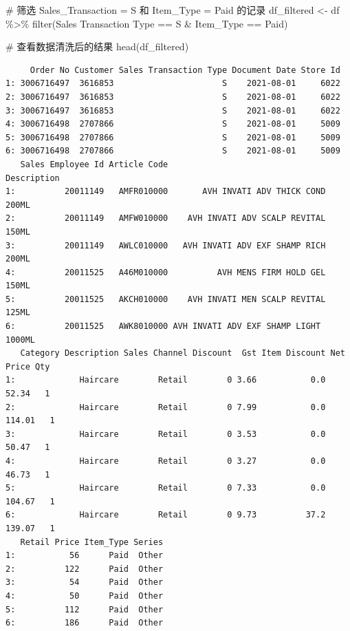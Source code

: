 \documentclass[
  letterpaper,
  DIV=11,
  numbers=noendperiod]{scrartcl}
\newenvironment{Shaded}{\begin{snugshade}}{\end{snugshade}}
\newcommand{\AttributeTok}[1]{\textcolor[rgb]{0.40,0.45,0.13}{#1}}
\newcommand{\CommentTok}[1]{\textcolor[rgb]{0.37,0.37,0.37}{#1}}
\newcommand{\FunctionTok}[1]{\textcolor[rgb]{0.28,0.35,0.67}{#1}}
\newcommand{\NormalTok}[1]{\textcolor[rgb]{0.00,0.23,0.31}{#1}}
\newcommand{\OtherTok}[1]{\textcolor[rgb]{0.00,0.23,0.31}{#1}}
\newcommand{\SpecialCharTok}[1]{\textcolor[rgb]{0.37,0.37,0.37}{#1}}
\newcommand{\StringTok}[1]{\textcolor[rgb]{0.13,0.47,0.30}{#1}}
\begin{document}
\begin{Shaded}
\begin{Highlighting}[]
\CommentTok{\# 筛选 Sales\_Transaction = \textquotesingle{}S\textquotesingle{} 和 Item\_Type = \textquotesingle{}Paid\textquotesingle{} 的记录}
\NormalTok{df\_filtered }\OtherTok{\textless{}{-}}\NormalTok{ df }\SpecialCharTok{\%\textgreater{}\%}
  \FunctionTok{filter}\NormalTok{(}\StringTok{\textasciigrave{}}\AttributeTok{Sales Transaction Type}\StringTok{\textasciigrave{}} \SpecialCharTok{==} \StringTok{\textquotesingle{}S\textquotesingle{}} \SpecialCharTok{\&}\NormalTok{ Item\_Type }\SpecialCharTok{==} \StringTok{\textquotesingle{}Paid\textquotesingle{}}\NormalTok{)}

\CommentTok{\# 查看数据清洗后的结果}
\FunctionTok{head}\NormalTok{(df\_filtered)}
\end{Highlighting}
\end{Shaded}

\begin{verbatim}
     Order No Customer Sales Transaction Type Document Date Store Id
1: 3006716497  3616853                      S    2021-08-01     6022
2: 3006716497  3616853                      S    2021-08-01     6022
3: 3006716497  3616853                      S    2021-08-01     6022
4: 3006716498  2707866                      S    2021-08-01     5009
5: 3006716498  2707866                      S    2021-08-01     5009
6: 3006716498  2707866                      S    2021-08-01     5009
   Sales Employee Id Article Code                           Description
1:          20011149   AMFR010000       AVH INVATI ADV THICK COND 200ML
2:          20011149   AMFW010000    AVH INVATI ADV SCALP REVITAL 150ML
3:          20011149   AWLC010000   AVH INVATI ADV EXF SHAMP RICH 200ML
4:          20011525   A46M010000          AVH MENS FIRM HOLD GEL 150ML
5:          20011525   AKCH010000    AVH INVATI MEN SCALP REVITAL 125ML
6:          20011525   AWK8010000 AVH INVATI ADV EXF SHAMP LIGHT 1000ML
   Category Description Sales Channel Discount  Gst Item Discount Net Price Qty
1:             Haircare        Retail        0 3.66           0.0     52.34   1
2:             Haircare        Retail        0 7.99           0.0    114.01   1
3:             Haircare        Retail        0 3.53           0.0     50.47   1
4:             Haircare        Retail        0 3.27           0.0     46.73   1
5:             Haircare        Retail        0 7.33           0.0    104.67   1
6:             Haircare        Retail        0 9.73          37.2    139.07   1
   Retail Price Item_Type Series
1:           56      Paid  Other
2:          122      Paid  Other
3:           54      Paid  Other
4:           50      Paid  Other
5:          112      Paid  Other
6:          186      Paid  Other
\end{verbatim}
\end{document}

